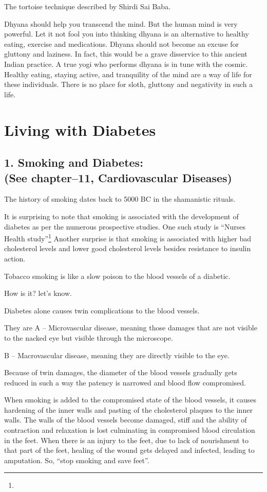 \item 
 The tortoise technique described by Shirdi Sai Baba.

 Dhyana should help you transcend the mind. But the human mind is very powerful. Let it not fool you into thinking dhyana is an alternative to healthy eating, exercise and medications. Dhyana should not become an excuse for gluttony and laziness. In fact, this would be a grave disservice to this ancient Indian practice. A true yogi who performs dhyana is in tune with the cosmic. Healthy eating, staying active, and tranquility of the mind are a way of life for these individuals. There is no place for sloth, gluttony and negativity in such a life.



\chapter{Living with Diabetes}

\section{1. Smoking and Diabetes:\\ (See chapter–11, Cardiovascular Diseases)}

The history of smoking dates back to 5000 BC in the shamanistic rituals.

It is surprising to note that smoking is associated with the development of diabetes as per the numerous prospective studies. One such study is “Nurses Health study”\footnote{} Another surprise is that smoking is associated with higher bad cholesterol levels and lower good cholesterol levels besides resistance to insulin action.

Tobacco smoking is like a slow poison to the blood vessels of a diabetic.

How is it? let’s know.

Diabetes alone causes twin complications to the blood vessels.

They are A – Microvascular disease, meaning those damages that are not visible to the nacked eye but visible through the microscope.

B – Macrovascular disease, meaning they are directly visible to the eye.

Because of twin damages, the diameter of the blood vessels gradually gets reduced in such a way the patency is narrowed and blood flow compromised.

When smoking is added to the compromised state of the blood vessels, it causes hardening of the inner walls and pasting of the cholesterol plaques to the inner walls. The walls of the blood vessels become damaged, stiff and the ability of contraction and relaxation is lost culminating in compromised blood circulation in the feet. When there is an injury to the feet, due to lack of nourishment to that part of the feet, healing of the wound gets delayed and infected, leading to amputation. So, “stop smoking and save feet”.

